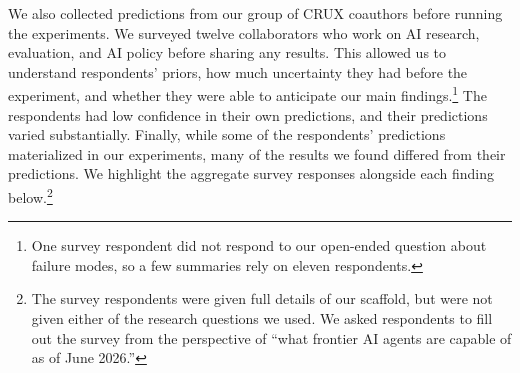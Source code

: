 We also collected predictions from our group of CRUX coauthors before running
the experiments. We surveyed twelve collaborators who work on AI research,
evaluation, and AI policy before sharing any results. This allowed us to
understand respondents' priors, how much uncertainty they had before the
experiment, and whether they were able to anticipate our main findings.\footnote{One survey respondent did not respond to our open-ended question about failure modes, so a few summaries rely on eleven respondents.} The
respondents had low confidence in their own predictions, and their predictions varied substantially. Finally, while some of the respondents'
predictions materialized in our experiments, many of the results we found
differed from their predictions. We highlight the aggregate survey responses
alongside each finding below.\footnote{The survey respondents were given full
details of our scaffold, but were not given either of the research questions we
used. We asked respondents to fill out the survey from the perspective of
``what frontier AI agents are capable of as of June 2026.''}
